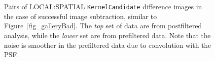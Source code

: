 \documentclass[prd, nofootinbib, floatfix, 11pt,tightenlines,times]{article}
\begin{document}
\begin{figure}
\begin{center}
 \\
 \\
\end{center}
\caption{Pairs of LOCAL:SPATIAL {\tt KernelCandidate} difference images in the case of
  successful image subtraction, similar to
  Figure~\ref{fig_galleryBad}.  The {\it top} set of data are from
  postfiltered analysis, while the {\it lower} set are from
  prefiltered data.  Note that the noise is smoother in the
  prefiltered data due to convolution with the PSF. }
\label{fig_galleryGood}
\end{figure}
\end{document}
